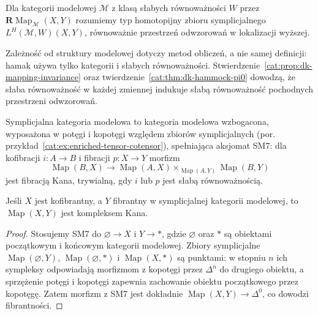 \begin{definicja}\label{cat:def:dk-derived-mapping-space}
Dla kategorii modelowej $\mathcal M$ z klasą słabych równoważności $W$ przez $\mathbf R\operatorname{Map}_{\mathcal M}(X,Y)$ rozumiemy typ homotopijny zbioru symplicjalnego $L^H(\mathcal M,W)(X,Y)$, równoważnie przestrzeń odwzorowań w lokalizacji wyższej.
\end{definicja}

Zależność od struktury modelowej dotyczy metod obliczeń, a nie samej definicji: hamak używa tylko kategorii i słabych równoważności. Stwierdzenie~\ref{cat:prop:dk-mapping-invariance} oraz twierdzenie~\ref{cat:thm:dk-hammock-pi0} dowodzą, że słaba równoważność w każdej zmiennej indukuje słabą równoważność pochodnych przestrzeni odwzorowań.

\begin{definicja}\label{cat:def:dk-simplicial-model}
Symplicjalna kategoria modelowa to kategoria modelowa wzbogacona, wyposażona w potęgi i kopotęgi względem zbiorów symplicjalnych (por. przykład~\ref{cat:ex:enriched-tensor-cotensor}), spełniająca aksjomat SM7: dla kofibracji $i:A\to B$ i fibracji $p:X\to Y$ morfizm
\[
 \operatorname{Map}(B,X)\longrightarrow
 \operatorname{Map}(A,X)\times_{\operatorname{Map}(A,Y)}
 \operatorname{Map}(B,Y)
\]
jest fibracją Kana, trywialną, gdy $i$ lub $p$ jest słabą równoważnością.
\end{definicja}

\begin{stwierdzenie}\label{cat:prop:dk-simplicial-model-mapping}
Jeśli $X$ jest kofibrantny, a $Y$ fibrantny w symplicjalnej kategorii modelowej, to $\operatorname{Map}(X,Y)$ jest kompleksem Kana.
\end{stwierdzenie}
\begin{proof}
Stosujemy SM7 do $\varnothing\to X$ i $Y\to *$, gdzie $\varnothing$ oraz $*$ są obiektami początkowym i końcowym kategorii modelowej. Zbiory symplicjalne $\operatorname{Map}(\varnothing,Y)$, $\operatorname{Map}(\varnothing,*)$ i $\operatorname{Map}(X,*)$ są punktami: w stopniu $n$ ich sympleksy odpowiadają morfizmom z kopotęgi przez $\Delta^n$ do drugiego obiektu, a sprzężenie potęgi i kopotęgi zapewnia zachowanie obiektu początkowego przez kopotęgę. Zatem morfizm z SM7 jest dokładnie $\operatorname{Map}(X,Y)\to\Delta^0$, co dowodzi fibrantności.
\end{proof}

